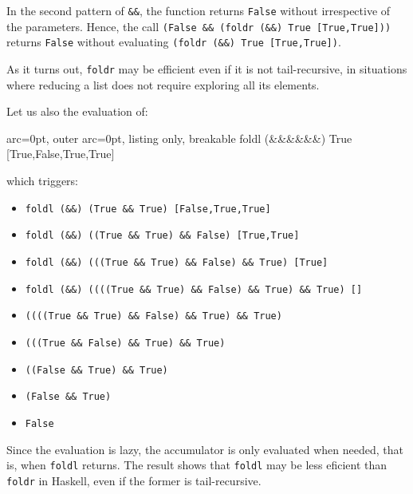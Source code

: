 In the second pattern of \texttt{\&\&}, the function returns \texttt{False} without irrespective of the parameters. Hence, the call \texttt{(False \&\& (foldr (\&\&) True [True,True]))} returns \texttt{False} without evaluating \texttt{(foldr (\&\&) True [True,True])}.

As it turns out, \texttt{foldr} may be efficient even if it is not tail-recursive, in situations where reducing a list does not require exploring all its elements.

Let us also the evaluation of:

\begin{tcblisting}{ arc=0pt, outer arc=0pt, listing only, breakable}
foldl (&\&&&\&&) True [True,False,True,True]

\end{tcblisting}


which triggers:
\begin{itemize}
	\item  \texttt{foldl (\&\&) (True \&\& True) [False,True,True]}
	\item  \texttt{foldl (\&\&) ((True \&\& True) \&\& False) [True,True]}
	\item  \texttt{foldl (\&\&) (((True \&\& True) \&\& False) \&\& True) [True]}
	\item  \texttt{foldl (\&\&) ((((True \&\& True) \&\& False) \&\& True) \&\& True) []}
	\item  \texttt{((((True \&\& True) \&\& False) \&\& True) \&\& True)}
	\item  \texttt{(((True \&\& False) \&\& True) \&\& True)}
	\item  \texttt{((False \&\& True) \&\& True)}
	\item  \texttt{(False \&\& True)}
	\item  \texttt{False}
\end{itemize}

Since the evaluation is lazy, the accumulator is only evaluated when needed, that is, when \texttt{foldl} returns. The result shows that \texttt{foldl} may be less eficient than \texttt{foldr} in Haskell, even if the former is tail-recursive.


 
